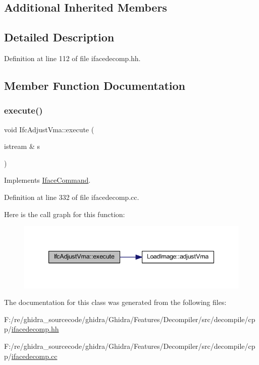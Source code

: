 \subsection*{Additional Inherited Members}


\subsection{Detailed Description}


Definition at line 112 of file ifacedecomp.\+hh.



\subsection{Member Function Documentation}
\mbox{\label{class_ifc_adjust_vma_aa7bfa89237119c9aaa0db9c38ec5112b}} 
\subsubsection{\texorpdfstring{execute()}{execute()}}
{\footnotesize\ttfamily void Ifc\+Adjust\+Vma\+::execute (\begin{DoxyParamCaption}\item[{istream \&}]{s }\end{DoxyParamCaption})\hspace{0.3cm}{\ttfamily [virtual]}}



Implements \mbox{\hyperlink{class_iface_command_af10e29cee2c8e419de6efe9e680ad201}{Iface\+Command}}.



Definition at line 332 of file ifacedecomp.\+cc.

Here is the call graph for this function\+:
\nopagebreak
\begin{figure}[H]
\begin{center}
\leavevmode
\includegraphics[width=347pt]{class_ifc_adjust_vma_aa7bfa89237119c9aaa0db9c38ec5112b_cgraph}
\end{center}
\end{figure}


The documentation for this class was generated from the following files\+:\begin{DoxyCompactItemize}
\item 
F\+:/re/ghidra\+\_\+sourcecode/ghidra/\+Ghidra/\+Features/\+Decompiler/src/decompile/cpp/\mbox{\hyperlink{ifacedecomp_8hh}{ifacedecomp.\+hh}}\item 
F\+:/re/ghidra\+\_\+sourcecode/ghidra/\+Ghidra/\+Features/\+Decompiler/src/decompile/cpp/\mbox{\hyperlink{ifacedecomp_8cc}{ifacedecomp.\+cc}}\end{DoxyCompactItemize}
